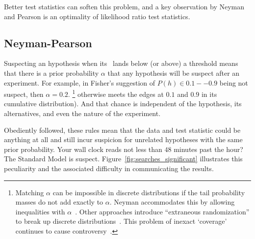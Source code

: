 Better test statistics can soften this problem, and a key observation by
Neyman and Pearson is an optimality of likelihood ratio test statistics.


\subsection{Neyman-Pearson}
\label{sec:searches_np}
Suspecting an hypothesis when its \pvalue\ lands below (or above) a threshold
means that there is a prior probability $\alpha$ that any hypothesis will be
suspect after an experiment.
For example, in Fisher's suggestion of $P(h) \in 0.1--0.9$ being not suspect,
then $\alpha = 0.2$.%
\footnote{%
Matching $\alpha$ can be impossible in discrete distributions if
the tail probability masses do not add exactly to $\alpha$.
Neyman accommodates this by allowing inequalities with $\alpha$~\cite{
neyman1935Intervals
}.
Other approaches introduce ``extraneous randomization'' to
break up discrete distributions~\cite{tocher1950discontinuous}.
This problem of inexact `coverage' continues to cause controversy~\cite{
Read2002cls,
Feldman:1997qc,
cousins2008evaluation,
Cranmer2006Statistical
}.%
}
otherwise meets the edges at $0.1$ and $0.9$ in its cumulative distribution).
And that chance is independent of the hypothesis, its alternatives, and even
the nature of the experiment.

Obediently followed, these rules mean that the data and test statistic could be
anything at all and still incur suspicion for unrelated hypotheses with the
same prior probability.
Your wall clock reads not less than $48$ minutes past the hour?
The Standard Model is suspect.
Figure~\ref{fig:searches_significant} illustrates this peculiarity and the
associated difficulty in communicating the results.

